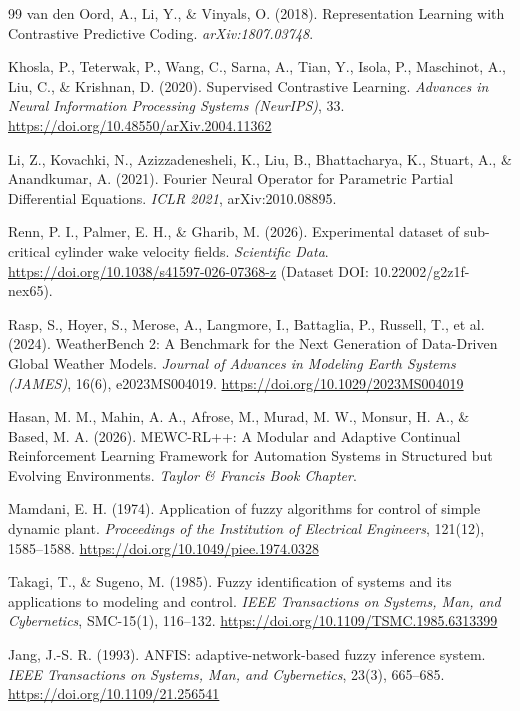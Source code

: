 \documentclass[11pt,a4paper]{article}
\begin{document}
\begin{thebibliography}{99}
van den Oord, A., Li, Y., \& Vinyals, O. (2018). Representation Learning with Contrastive Predictive Coding. \textit{arXiv:1807.03748}.

Khosla, P., Teterwak, P., Wang, C., Sarna, A., Tian, Y., Isola, P., Maschinot, A., Liu, C., \& Krishnan, D. (2020). Supervised Contrastive Learning. \textit{Advances in Neural Information Processing Systems (NeurIPS)}, 33. \url{https://doi.org/10.48550/arXiv.2004.11362}

Li, Z., Kovachki, N., Azizzadenesheli, K., Liu, B., Bhattacharya, K., Stuart, A., \& Anandkumar, A. (2021). Fourier Neural Operator for Parametric Partial Differential Equations. \textit{ICLR 2021}, arXiv:2010.08895.

Renn, P. I., Palmer, E. H., \& Gharib, M. (2026). Experimental dataset of sub-critical cylinder wake velocity fields. \textit{Scientific Data}. \url{https://doi.org/10.1038/s41597-026-07368-z} (Dataset DOI: 10.22002/g2z1f-nex65).

Rasp, S., Hoyer, S., Merose, A., Langmore, I., Battaglia, P., Russell, T., et al. (2024). WeatherBench 2: A Benchmark for the Next Generation of Data-Driven Global Weather Models. \textit{Journal of Advances in Modeling Earth Systems (JAMES)}, 16(6), e2023MS004019. \url{https://doi.org/10.1029/2023MS004019}

Hasan, M. M., Mahin, A. A., Afrose, M., Murad, M. W., Monsur, H. A., \& Based, M. A. (2026). MEWC-RL++: A Modular and Adaptive Continual Reinforcement Learning Framework for Automation Systems in Structured but Evolving Environments. \textit{Taylor \& Francis Book Chapter}.

Mamdani, E. H. (1974). Application of fuzzy algorithms for control of simple dynamic plant. \textit{Proceedings of the Institution of Electrical Engineers}, 121(12), 1585--1588. \url{https://doi.org/10.1049/piee.1974.0328}

Takagi, T., \& Sugeno, M. (1985). Fuzzy identification of systems and its applications to modeling and control. \textit{IEEE Transactions on Systems, Man, and Cybernetics}, SMC-15(1), 116--132. \url{https://doi.org/10.1109/TSMC.1985.6313399}

Jang, J.-S. R. (1993). ANFIS: adaptive-network-based fuzzy inference system. \textit{IEEE Transactions on Systems, Man, and Cybernetics}, 23(3), 665--685. \url{https://doi.org/10.1109/21.256541}

\end{thebibliography}
\end{document}
